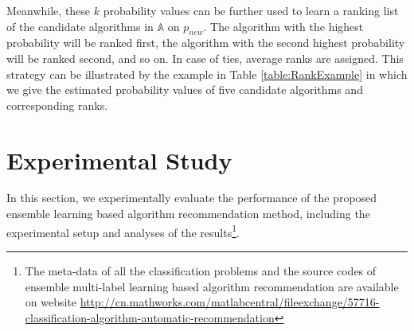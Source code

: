 \documentclass[acmsmall]{acmart}
\begin{document}
\begin{table}[!h]
	\caption{Example for Ranking Strategy}\label{table:RankExample}
	\centering
	\scriptsize
\end{table}

Meanwhile, these $k$ probability values can be further used to learn
a ranking list of the candidate algorithms in $\mathbb{A}$ on
$p_{new}$. The algorithm with the highest probability will be ranked
first, the algorithm with the second highest probability will be
ranked second, and so on. In case of ties, average ranks are
assigned. This strategy can be illustrated by the example in Table
\ref{table:RankExample} in which we give the estimated probability
values of five candidate algorithms and corresponding ranks.

\section{Experimental Study}\label{sec:ExpStudy}
In this section, we experimentally evaluate the performance of the
proposed ensemble learning based algorithm recommendation method,
including the experimental setup and analyses of the results\footnote{The meta-data of all the classification problems and the source codes of ensemble multi-label learning based algorithm recommendation are available on website \url{http://cn.mathworks.com/matlabcentral/fileexchange/57716-classification-algorithm-automatic-recommendation}}.
\end{document}
